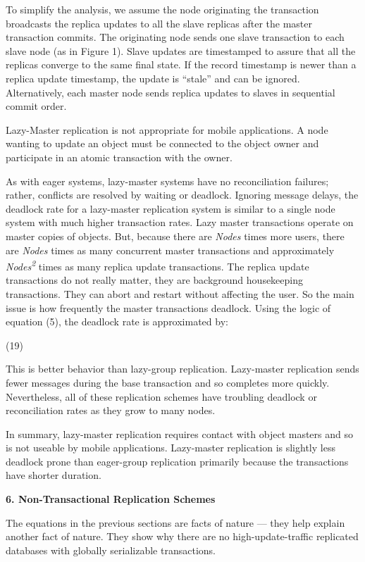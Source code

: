 \documentclass[a4paper,12pt,twoside,openright]{article}
\begin{document}
To simplify the analysis, we assume the node originating the transaction
broadcasts the replica updates to all the slave replicas after the
master transaction commits. The originating node sends one slave
transaction to each slave node (as in Figure 1). Slave updates are
timestamped to assure that all the replicas converge to the same final
state. If the record timestamp is newer than a replica update timestamp,
the update is ``stale'' and can be ignored. Alternatively, each master
node sends replica updates to slaves in sequential commit order.

Lazy-Master replication is not appropriate for mobile applications. A
node wanting to update an object must be connected to the object owner
and participate in an atomic transaction with the owner.

As with eager systems, lazy-master systems have no reconciliation
failures; rather, conflicts are resolved by waiting or deadlock.
Ignoring message delays, the deadlock rate for a lazy-master replication
system is similar to a single node system with much higher transaction
rates. Lazy master transactions operate on master copies of objects.
But, because there are \emph{Nodes} times more users, there are
\emph{Nodes} times as many concurrent master transactions and
approximately \emph{Nodes\textsuperscript{2}} times as many replica
update transactions. The replica update transactions do not really
matter, they are background housekeeping transactions. They can abort
and restart without affecting the user. So the main issue is how
frequently the master transactions deadlock. Using the logic of equation
(5), the deadlock rate is approximated by:

(19)

This is better behavior than lazy-group replication. Lazy-master
replication sends fewer messages during the base transaction and so
completes more quickly. Nevertheless, all of these replication schemes
have troubling deadlock or reconciliation rates as they grow to many
nodes.

In summary, lazy-master replication requires contact with object masters
and so is not useable by mobile applications. Lazy-master replication is
slightly less deadlock prone than eager-group replication primarily
because the transactions have shorter duration.

\textbf{6. Non-Transactional Replication Schemes}

The equations in the previous sections are facts of nature --- they help
explain another fact of nature. They show why there are no
high-update-traffic replicated databases with globally serializable
transactions.
\end{document}
